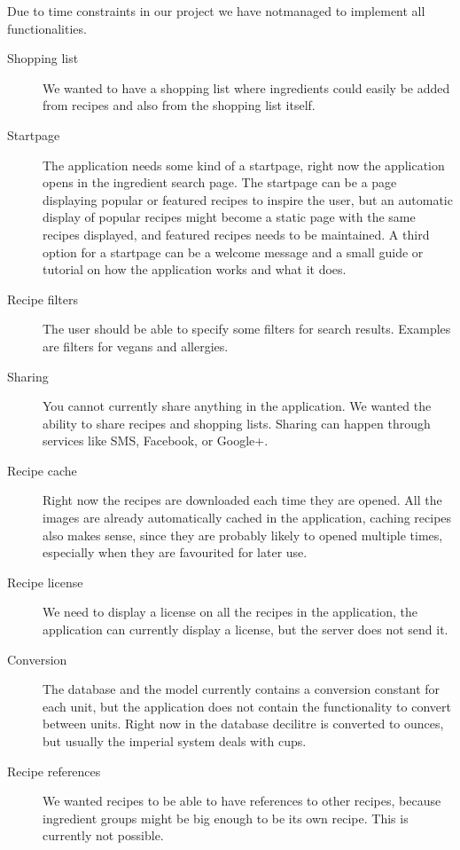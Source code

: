 Due to time constraints in our project we have notmanaged to implement all functionalities.

\begin{description}
\item[Shopping list] We wanted to have a shopping list where ingredients could easily be added from recipes and also from the shopping list itself.

\item[Startpage] The application needs some kind of a startpage, right now the application opens in the ingredient search page. The startpage can be a page displaying popular or featured recipes to inspire the user, but an automatic display of popular recipes might become a static page with the same recipes displayed, and featured recipes needs to be maintained. A third option for a startpage can be a welcome message and a small guide or tutorial on how the application works and what it does.

\item[Recipe filters] The user should be able to specify some filters for search results. Examples are filters for vegans and allergies.

\item[Sharing] You cannot currently share anything in the application. We wanted the ability to share recipes and shopping lists. Sharing can happen through services like SMS, Facebook, or Google+.

\item[Recipe cache] Right now the recipes are downloaded each time they are opened. All the images are already automatically cached in the application, caching recipes also makes sense, since they are probably likely to opened multiple times, especially when they are favourited for later use.

\item[Recipe license] We need to display a license on all the recipes in the application, the application can currently display a license, but the server does not send it.

\item[Conversion] The database and the model currently contains a conversion constant for each unit, but the application does not contain the functionality to convert between units. Right now in the database decilitre is converted to ounces, but usually the imperial system deals with cups.

\item[Recipe references] We wanted recipes to be able to have references to other recipes, because ingredient groups might be big enough to be its own recipe. This is currently not possible.


\end{description}
